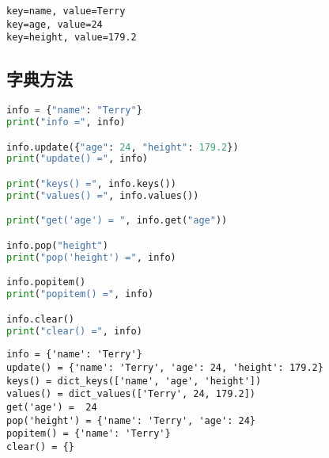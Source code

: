 \begin{tcolorbox}
	\begin{verbatim}
key=name, value=Terry
key=age, value=24
key=height, value=179.2
\end{verbatim}
\end{tcolorbox}

\vspace{0.5cm}

\subsection{字典方法}

\begin{table}[H]
	\centering
	\caption{字典方法}
\end{table}


\begin{lstlisting}[language=Python]
info = {"name": "Terry"}
print("info =", info)

info.update({"age": 24, "height": 179.2})
print("update() =", info)

print("keys() =", info.keys())
print("values() =", info.values())

print("get('age') = ", info.get("age"))

info.pop("height")
print("pop('height') =", info)

info.popitem()
print("popitem() =", info)

info.clear()
print("clear() =", info)
\end{lstlisting}

\begin{tcolorbox}
	\begin{verbatim}
info = {'name': 'Terry'}
update() = {'name': 'Terry', 'age': 24, 'height': 179.2}
keys() = dict_keys(['name', 'age', 'height'])
values() = dict_values(['Terry', 24, 179.2])
get('age') =  24
pop('height') = {'name': 'Terry', 'age': 24}
popitem() = {'name': 'Terry'}
clear() = {}
\end{verbatim}
\end{tcolorbox}

